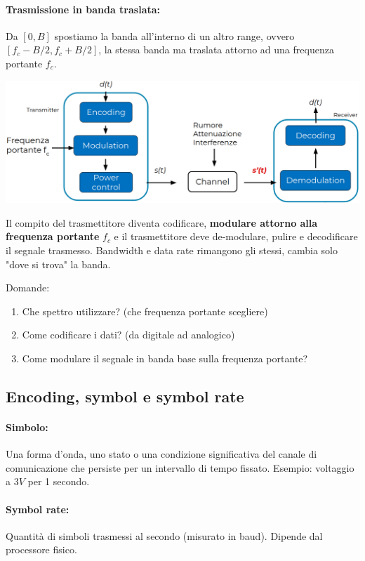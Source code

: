 \paragraph{Trasmissione in banda traslata:} Da $[0,B]$ spostiamo la banda all'interno di un altro range, ovvero $[f_c - B/2, f_c + B/2]$, la stessa banda ma traslata attorno ad una frequenza portante $f_c$.
\begin{center}
	\includegraphics[width=0.95\linewidth]{img/wireless/bandatraslata1}
\end{center}

Il compito del trasmettitore diventa codificare, \textbf{modulare attorno alla frequenza portante} $f_c$ e il trasmettitore deve de-modulare, pulire e decodificare il segnale trasmesso. Bandwidth e data rate rimangono gli stessi, cambia solo "dove si trova" la banda.

Domande: 
\begin{enumerate}
	\item Che spettro utilizzare? (che frequenza portante scegliere)

	\item Come codificare i dati? (da digitale ad analogico)

	\item Come modulare il segnale in banda base sulla frequenza portante?
\end{enumerate}

\subsection{Encoding, symbol e symbol rate}

\paragraph{Simbolo:} Una forma d'onda, uno stato o una condizione significativa del canale di comunicazione che persiste per un intervallo di tempo fissato. Esempio: voltaggio a $3V$ per 1 secondo.

\paragraph{Symbol rate:} Quantità di simboli trasmessi al secondo (misurato in baud). Dipende dal processore fisico.

